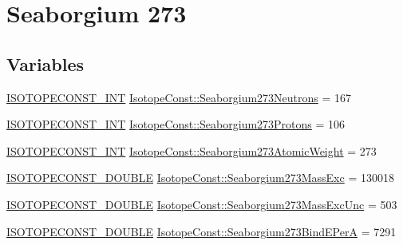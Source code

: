 \hypertarget{group___isotope_const-_seaborgium-_sg273}{}\section{Seaborgium 273}
\label{group___isotope_const-_seaborgium-_sg273}
\subsection*{Variables}
\begin{DoxyCompactItemize}
\item 
\mbox{\hyperlink{group___isotope_const-_macros_ga5f18360b3e99483a35c32d789e62621c}{I\+S\+O\+T\+O\+P\+E\+C\+O\+N\+S\+T\+\_\+\+I\+NT}} \mbox{\hyperlink{group___isotope_const-_seaborgium-_sg273_ga4a90620a93b453cf627ce51783838d87}{Isotope\+Const\+::\+Seaborgium273\+Neutrons}} = 167
\item 
\mbox{\hyperlink{group___isotope_const-_macros_ga5f18360b3e99483a35c32d789e62621c}{I\+S\+O\+T\+O\+P\+E\+C\+O\+N\+S\+T\+\_\+\+I\+NT}} \mbox{\hyperlink{group___isotope_const-_seaborgium-_sg273_ga5d19818ac439a2564a9e7d640e632985}{Isotope\+Const\+::\+Seaborgium273\+Protons}} = 106
\item 
\mbox{\hyperlink{group___isotope_const-_macros_ga5f18360b3e99483a35c32d789e62621c}{I\+S\+O\+T\+O\+P\+E\+C\+O\+N\+S\+T\+\_\+\+I\+NT}} \mbox{\hyperlink{group___isotope_const-_seaborgium-_sg273_ga7e555146916f83e3efe3691cd4336d6e}{Isotope\+Const\+::\+Seaborgium273\+Atomic\+Weight}} = 273
\item 
\mbox{\hyperlink{group___isotope_const-_macros_ga8f45a7272ce02c0b4c65c44636ed719a}{I\+S\+O\+T\+O\+P\+E\+C\+O\+N\+S\+T\+\_\+\+D\+O\+U\+B\+LE}} \mbox{\hyperlink{group___isotope_const-_seaborgium-_sg273_gaf59f0065326b100d3ca9ccc481c24484}{Isotope\+Const\+::\+Seaborgium273\+Mass\+Exc}} = 130018
\item 
\mbox{\hyperlink{group___isotope_const-_macros_ga8f45a7272ce02c0b4c65c44636ed719a}{I\+S\+O\+T\+O\+P\+E\+C\+O\+N\+S\+T\+\_\+\+D\+O\+U\+B\+LE}} \mbox{\hyperlink{group___isotope_const-_seaborgium-_sg273_ga6686e3b18807601a7fe5dd40b5a4702b}{Isotope\+Const\+::\+Seaborgium273\+Mass\+Exc\+Unc}} = 503
\item 
\mbox{\hyperlink{group___isotope_const-_macros_ga8f45a7272ce02c0b4c65c44636ed719a}{I\+S\+O\+T\+O\+P\+E\+C\+O\+N\+S\+T\+\_\+\+D\+O\+U\+B\+LE}} \mbox{\hyperlink{group___isotope_const-_seaborgium-_sg273_gaef8e814d22d3d362ad06f78a723065e9}{Isotope\+Const\+::\+Seaborgium273\+Bind\+E\+PerA}} = 7291
\item 

\end{DoxyCompactItemize}
